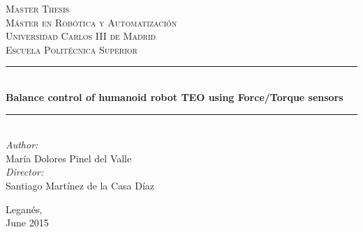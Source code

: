 %



\begin{titlepage}

\newcommand{\HRule}{\rule{\linewidth}{0.5mm}} %

\center %

\textsc{\LARGE Master Thesis}\\[1.5cm] %
 
\textsc{\Large Máster en Robótica y Automatización}\\[0.5cm] %
\textsc{\large Universidad Carlos III de Madrid}\\[0.5cm]%
\textsc{\large Escuela Politécnica Superior}
\\[2cm]
\HRule \\[0.8cm]
{ \huge \bfseries 
Balance control of humanoid robot TEO using Force/Torque sensors}\\[0.4cm] %
\HRule \\[1.5cm]


\large
\emph{Author:}\\
María Dolores Pinel del Valle
\\
\emph{Director:}\\
Santiago Martínez de la Casa Díaz
\vspace{2cm}

{\large Leganés,\\
June 2015}\\[2cm] %


\vfill %

\end{titlepage}

